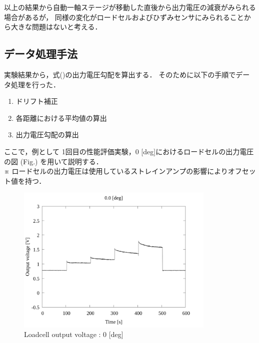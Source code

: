 
\newpage

以上の結果から自動一軸ステージが移動した直後から出力電圧の減衰がみられる場合があるが，
同様の変化がロードセルおよびひずみセンサにみられることから大きな問題はないと考える．

\subsection{データ処理手法}

実験結果から，式()の出力電圧勾配を算出する．
そのために以下の手順でデータ処理を行った．

\begin{enumerate}[(1)]
	\item ドリフト補正
	\item 各距離における平均値の算出
	\item 出力電圧勾配の算出
\end{enumerate}

ここで，例として 1回目の性能評価実験，0 [deg]におけるロードセルの出力電圧の図 (Fig.) を用いて説明する．\\
※ ロードセルの出力電圧は使用しているストレインアンプの影響によりオフセット値を持つ．

\begin{figure}[htbp]
	\footnotesize
	\begin{center}
		\includegraphics[width=95mm]{../../02_workspace/result/2-1/plot/01-1_loadcell/01_loadcell_0.png}
		\caption{Loadcell output voltage : 0 [deg]}
	\end{center}
\end{figure}

